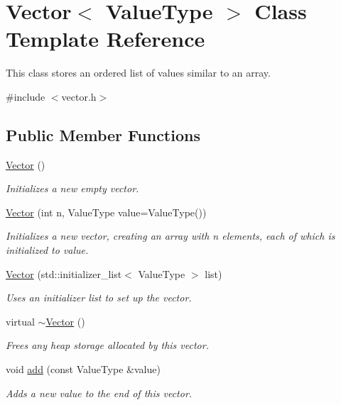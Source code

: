 \hypertarget{classVector}{}\section{Vector$<$ Value\+Type $>$ Class Template Reference}
\label{classVector}


This class stores an ordered list of values similar to an array.  




{\ttfamily \#include $<$vector.\+h$>$}

\subsection*{Public Member Functions}
\begin{DoxyCompactItemize}
\item 
\mbox{\hyperlink{classVector_a4df026156780bc0ca651c342b7d6daa4}{Vector}} ()
\begin{DoxyCompactList}\small\item\em Initializes a new empty vector. \end{DoxyCompactList}\item 
\mbox{\hyperlink{classVector_abf5f4a6c2e8f722dfaed5c07027a84ac}{Vector}} (int n, Value\+Type value=Value\+Type())
\begin{DoxyCompactList}\small\item\em Initializes a new vector, creating an array with {\ttfamily n} elements, each of which is initialized to {\ttfamily value}. \end{DoxyCompactList}\item 
\mbox{\hyperlink{classVector_a81ccc7dac38b6bdeca04281b1acb39c0}{Vector}} (std\+::initializer\+\_\+list$<$ Value\+Type $>$ list)
\begin{DoxyCompactList}\small\item\em Uses an initializer list to set up the vector. \end{DoxyCompactList}\item 
virtual \mbox{\hyperlink{classVector_aaa9fccd0cb7734271f7a15e5d9dc0d27}{$\sim$\+Vector}} ()
\begin{DoxyCompactList}\small\item\em Frees any heap storage allocated by this vector. \end{DoxyCompactList}\item 
void \mbox{\hyperlink{classVector_ab901606bf3a8019c986f0cf9a9f298dc}{add}} (const Value\+Type \&value)
\begin{DoxyCompactList}\small\item\em Adds a new value to the end of this vector. \end{DoxyCompactList}\item 

\end{DoxyCompactItemize}
